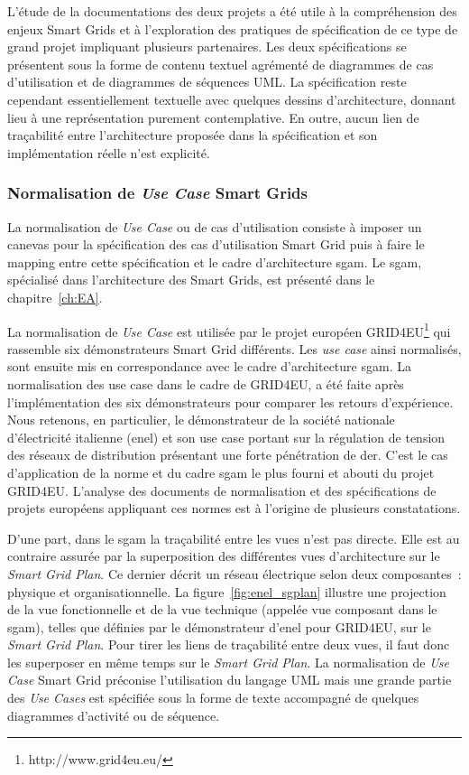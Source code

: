 L'étude de la documentations des deux projets a été utile à la compréhension des
enjeux Smart Grids et à l'exploration des pratiques de spécification de ce type
de grand projet impliquant plusieurs partenaires. Les deux spécifications se
présentent sous la forme de contenu textuel agrémenté de diagrammes de cas
d'utilisation et de diagrammes de séquences UML. La spécification reste
cependant essentiellement textuelle avec quelques dessins d'architecture, donnant
lieu à une représentation purement contemplative. En outre, aucun lien de
traçabilité entre l'architecture proposée dans la spécification et son
implémentation réelle n'est explicité.

\subsubsection{Normalisation de \textit{Use Case} Smart Grids}
\label{sec:ENEL}

La normalisation de \textit{Use Case} ou de cas d'utilisation consiste à
imposer un canevas pour la spécification des cas d'utilisation Smart Grid puis à
faire le mapping entre cette spécification et le cadre d'architecture
\gls{sgam}. Le \gls{sgam}, spécialisé dans l'architecture des Smart Grids, est
présenté dans le chapitre~\ref{ch:EA}.

La normalisation de \textit{Use Case} est utilisée par le projet européen
GRID4EU\footnote{http://www.grid4eu.eu/} qui rassemble six démonstrateurs Smart
Grid différents. Les \textit{use case} ainsi normalisés, sont ensuite mis en
correspondance avec le cadre d'architecture \gls{sgam}. La normalisation des use
case dans le cadre de GRID4EU, a été faite après l'implémentation des six
démonstrateurs pour comparer les retours d'expérience. Nous retenons, en
particulier, le démonstrateur de la société nationale d'électricité italienne
(\gls{enel}) et son use case portant sur la régulation de tension des réseaux de
distribution présentant une forte pénétration de \gls{der}. C'est le cas d'application
de la norme et du cadre \gls{sgam} le plus fourni et abouti du projet GRID4EU.
L'analyse des documents de normalisation et des spécifications de projets
européens appliquant ces normes est à l'origine de plusieurs constatations.

D'une part, dans le \gls{sgam} la traçabilité entre les vues n'est pas directe.
Elle est au contraire assurée par la superposition des différentes vues
d'architecture sur le \textit{Smart Grid Plan}. Ce dernier décrit un réseau
électrique selon deux composantes~: physique et organisationnelle. La
figure~\ref{fig:enel_sgplan} illustre une projection de la vue fonctionnelle et
de la vue technique (appelée vue composant dans le \gls{sgam}), telles que
définies par le démonstrateur d'\gls{enel} pour GRID4EU, sur le \textit{Smart
Grid Plan}. Pour tirer les liens de traçabilité entre deux vues, il faut donc
les superposer en même temps sur le \textit{Smart Grid Plan}. La normalisation
de \textit{Use Case} Smart Grid préconise l'utilisation du langage UML mais une
grande partie des \textit{Use Cases} est spécifiée sous la forme de texte
accompagné de quelques diagrammes d'activité ou de séquence.

